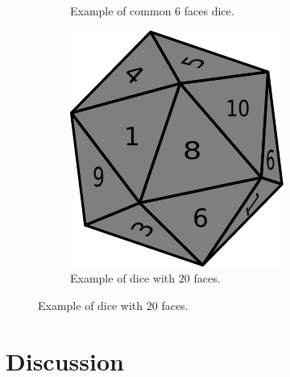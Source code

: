 \begin{figure}
\begin{subfigure}[t]{0.25\textwidth}
		\caption{Example of common $6$ faces dice.}
		\label{fig:dice_rolls:6faces_dice}
	 \end{subfigure}
	 \hfill
	 \begin{subfigure}[t]{0.25\textwidth}
		 \includegraphics[width=1\linewidth]{sources/dice_rolls/images/icosahedron_dice}
		 \caption{Example of dice with $20$ faces.}
		 \label{fig:dice_rolls:20faces_dice}
	  \end{subfigure}
\end{figure}

\section{Discussion}
\label{dice_rolls:sec:discussion}

